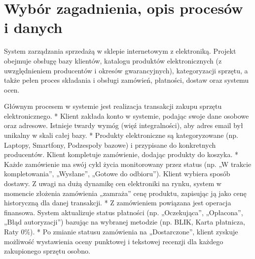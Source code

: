 \documentclass[letterpaper,10pt,polish]{sphinxmanual}
\begin{document}
\section{Wybór zagadnienia, opis procesów i danych}
\label{\detokenize{rozdzia_u0142_3/BD_PlanBazyDanych_zad1/index:wybor-zagadnienia-opis-procesow-i-danych}}
\sphinxAtStartPar
{} System zarządzania sprzedażą w sklepie internetowym z elektroniką.
Projekt obejmuje obsługę bazy klientów, katalogu produktów elektronicznych (z uwzględnieniem producentów i okresów gwarancyjnych), kategoryzacji sprzętu, a także pełen proces składania i obsługi zamówień, płatności, dostaw oraz systemu ocen.

\sphinxAtStartPar
{}

\sphinxAtStartPar
Głównym procesem w systemie jest realizacja transakcji zakupu sprzętu elektronicznego.
*  Klient zakłada konto w systemie, podając swoje dane osobowe oraz adresowe. Istnieje twardy wymóg (więź integralności), aby adres e\sphinxhyphen{}mail był unikalny w skali całej bazy.
*  Produkty elektroniczne są kategoryzowane (np. Laptopy, Smartfony, Podzespoły bazowe) i przypisane do konkretnych producentów. Klient kompletuje zamówienie, dodając produkty do koszyka.
*  Każde zamówienie ma swój cykl życia monitorowany przez status (np. „W trakcie kompletowania”, „Wysłane”, „Gotowe do odbioru”). Klient wybiera sposób dostawy. Z uwagi na dużą dynamikę cen elektroniki na rynku, system w momencie złożenia zamówienia „zamraża” cenę produktu, zapisując ją jako cenę historyczną dla danej transakcji.
*  Z zamówieniem powiązana jest operacja finansowa. System aktualizuje status płatności (np. „Oczekująca”, „Opłacona”, „Błąd autoryzacji”) bazując na wybranej metodzie (np. BLIK, Karta płatnicza, Raty 0\%).
*  Po zmianie statusu zamówienia na „Dostarczone”, klient zyskuje możliwość wystawienia oceny punktowej i tekstowej recenzji dla każdego zakupionego sprzętu osobno.
\end{document}
